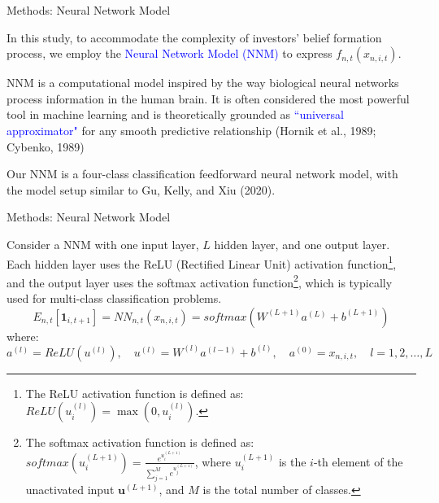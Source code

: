 \documentclass[11pt, aspectratio=169]{beamer}
\newenvironment{wideitemize}{\itemize\addtolength{\itemsep}{10pt}}{\enditemize}
\begin{document}
\begin{frame}{Methods: Neural Network Model}
    \bigskip
    \begin{wideitemize}
    \item In this study, to accommodate the complexity of investors' belief formation process, we employ the \textcolor{blue}{Neural Network Model (NNM)} to express $f_{n,t}(x_{n,i,t})$.
    \item NNM is a computational model inspired by the way \alert{biological neural networks} process information in the human brain. It is often considered the most powerful tool in machine learning and is theoretically grounded as \textcolor{blue}{``universal approximator"} for any smooth predictive relationship (Hornik et al., 1989; Cybenko, 1989)
    \item Our NNM is a \alert{four-class classification feedforward neural network model}, with the model setup similar to Gu, Kelly, and Xiu (2020). 
    \end{wideitemize}
\end{frame}

\begin{frame}{Methods: Neural Network Model}
    \bigskip
    \begin{wideitemize}
    \item Consider a NNM with one input layer, $L$ hidden layer, and one output layer. Each hidden layer uses the \alert{ReLU} (Rectified Linear Unit) activation function\footnote{The ReLU activation function is defined as: $ReLU(u^{(l)}_i)=\max(0,u^{(l)}_i)$.}, and the output layer uses the \alert{softmax} activation function\footnote{The softmax activation function is defined as: $softmax(u^{(L+1)}_i)=\frac{e^{u^{(L+1)}_i}}{\sum_{j=1}^Me^{u^{(L+1)}_j}}$, where $u^{(L+1)}_i$ is the $i$-th element of the unactivated input $\mathbf{u}^{(L+1)}$, and $M$ is the total number of classes.}, which is typically used for multi-class classification problems.
    \begin{equation*}
E_{n,t}[\mathbf{1}_{i,t+1}]=NN_{n,t}\left(x_{n,i,t}\right)=softmax\left(W^{(L+1)}a^{(L)}+b^{(L+1)}\right) \label{nn}
    \end{equation*}
    where:$$a^{(l)}=ReLU(u^{(l)}),\quad u^{(l)}=W^{(l)}a^{(l-1)}+b^{(l)},\quad a^{(0)}={x_{n,i,t}},\quad l=1,2,\ldots,L$$
    \end{wideitemize}
\end{frame}
\end{document}
